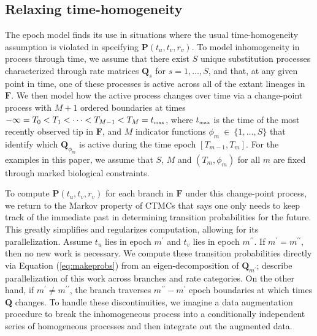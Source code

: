 \subsection{Relaxing time-homogeneity}

The epoch model finds its use in situations where the usual time-homogeneity assumption is violated in specifying $\mathbf{P}(t_u, t_v, r_v)$. 
To model inhomogeneity in process through time, we assume that there exist $S$ unique substitution processes characterized through rate matrices $\mathbf{Q}_s$ for $s = 1,\ldots,S$, and that, at any given point in time, one of these processes is active across all of the extant lineages in $\mathbf{F}$. 
We then model how the active process changes over time via a change-point process with $M + 1$ ordered boundaries at times 
$-\infty = T_0 < T_1 < \cdots < T_{M-1} < T_{M} = t_{\mbox{\tiny max}}$, where $t_{\mbox{\tiny max}}$ is the time of the most recently observed tip in $\mathbf{F}$, 
and $M$ indicator functions $\phi_m\ \in\ \{1,\ldots,S\}$ that identify which $\mathbf{Q}_{\phi_m}$ is active during the time epoch 
$\left[T_{m-1}, T_{m}\right]$.
For the examples in this paper, we assume that $S$, $M$ and $(T_m, \phi_m)$ for all $m$ are fixed through marked biological constraints.  

To compute $\mathbf{P}(t_u, t_v, r_v)$ for each branch in $\mathbf{F}$ under this change-point process, we return to the Markov property of CTMCs that says one only needs to keep track of the immediate past in determining transition probabilities for the future.  
This greatly simplifies and regularizes computation, allowing for its parallelization.  Assume $t_u$ lies in epoch $m^{\prime}$ and $t_v$ lies in epoch $m^{\prime\prime}$.  If $m^{\prime} = m^{\prime\prime}$, then no new work is necessary.  We compute these transition probabilities directly via Equation (\ref{eq:makeprobs}) from an eigen-decomposition of $\mathbf{Q}_{m^{\prime}}$; \citet{Suchard2009} describe parallelization of this work across branches and rate categories.
On the other hand, if $m^{\prime} \neq m^{\prime\prime}$,
the branch traverses $m^{\prime\prime} - m^{\prime}$ epoch boundaries at which times $\mathbf{Q}$ changes. To handle these discontinuities, we imagine a data augmentation procedure to break the inhomogeneous process into a conditionally independent series of homogeneous processes and then integrate out the augmented data.

